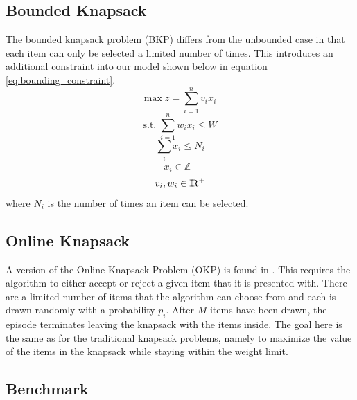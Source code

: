\documentclass[12pt]{article}
\begin{document}
\subsection{Bounded Knapsack}

The bounded knapsack problem (BKP) differs from the unbounded case in that each item can only be selected a limited number of times. 
This introduces an additional constraint into our model shown below in equation \ref{eq:bounding_constraint}.
%
\begin{equation}
\textrm{max} \; z = \sum_{i=1}^n v_i x_i
\end{equation}
%
\begin{equation}
\textrm{s.t.} \; \sum_{i=1}^n w_i x_i \leq W
\end{equation}
%
\begin{equation}
\sum_i x_i \leq N_i
\label{eq:bounding_constraint}
\end{equation}
%
\begin{equation}
x_i \in \mathbb{Z}^+
\end{equation}
%
\begin{equation}
v_i, w_i \in \rm I\!R^+
\end{equation}
%
where $N_i$ is the number of times an item can be selected.

\subsection{Online Knapsack}

A version of the Online Knapsack Problem (OKP) is found in \citet{Kong2019}.
This requires the algorithm to either accept or reject a given item that it is presented with.
There are a limited number of items that the algorithm can choose from and each is drawn randomly with a probability $p_i$. 
After $M$ items have been drawn, the episode terminates leaving the knapsack with the items inside.
The goal here is the same as for the traditional knapsack problems, namely to maximize the value of the items in the knapsack while staying within the weight limit.

\subsection{Benchmark}
\end{document}
